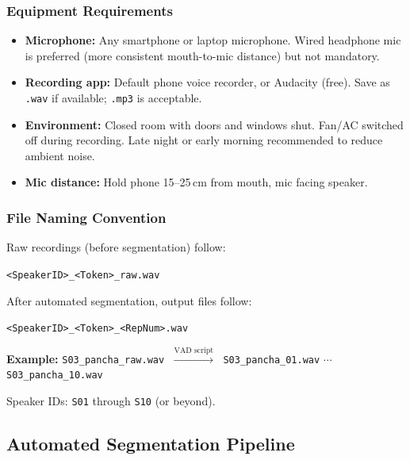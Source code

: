 \documentclass[12pt,a4paper]{article}
\begin{document}
\subsubsection{Equipment Requirements}

\begin{itemize}[itemsep=2pt]
  \item \textbf{Microphone:} Any smartphone or laptop microphone.
        Wired headphone mic is preferred (more consistent mouth-to-mic distance)
        but not mandatory.
  \item \textbf{Recording app:} Default phone voice recorder, or Audacity (free).
        Save as \texttt{.wav} if available; \texttt{.mp3} is acceptable.
  \item \textbf{Environment:} Closed room with doors and windows shut.
        Fan/AC switched off during recording.
        Late night or early morning recommended to reduce ambient noise.
  \item \textbf{Mic distance:} Hold phone 15--25\,cm from mouth, mic facing speaker.
\end{itemize}

\subsubsection{File Naming Convention}
\label{sec:naming}

Raw recordings (before segmentation) follow:
\begin{center}
  \texttt{<SpeakerID>\_<Token>\_raw.wav}
\end{center}
After automated segmentation, output files follow:
\begin{center}
  \texttt{<SpeakerID>\_<Token>\_<RepNum>.wav}
\end{center}

\noindent\textbf{Example:} \texttt{S03\_pancha\_raw.wav}
$\;\xrightarrow{\text{VAD script}}\;$
\texttt{S03\_pancha\_01.wav} $\cdots$ \texttt{S03\_pancha\_10.wav}

Speaker IDs: \texttt{S01} through \texttt{S10} (or beyond).

\subsection{Automated Segmentation Pipeline}
\end{document}
